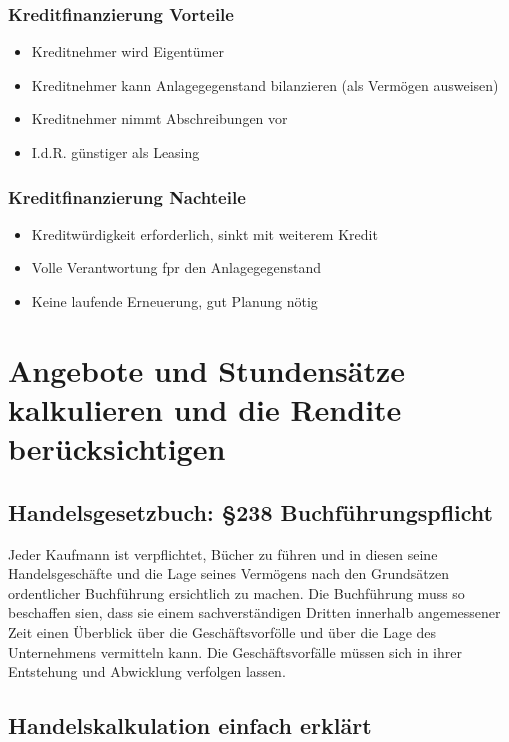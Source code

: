 \documentclass[a4paper, 12pt]{report}
\begin{document}
\begin{multicols}{2}
\subsubsection{Kreditfinanzierung Vorteile}
\begin{itemize}
    \item Kreditnehmer wird Eigentümer
    \item Kreditnehmer kann Anlagegegenstand bilanzieren (als Vermögen
	ausweisen)
    \item Kreditnehmer nimmt Abschreibungen vor
    \item I.d.R. günstiger als Leasing
\end{itemize}

\subsubsection{Kreditfinanzierung Nachteile}
\begin{itemize}
    \item Kreditwürdigkeit erforderlich, sinkt mit weiterem Kredit
    \item Volle Verantwortung fpr den Anlagegegenstand
    \item Keine laufende Erneuerung, gut Planung nötig
\end{itemize}

\section{Angebote und Stundensätze kalkulieren und die Rendite berücksichtigen}
\subsection{Handelsgesetzbuch: \S 238 Buchführungspflicht}

Jeder Kaufmann ist verpflichtet, Bücher zu führen und in diesen seine
Handelsgeschäfte und die Lage seines Vermögens nach den Grundsätzen ordentlicher
Buchführung ersichtlich zu machen. Die Buchführung muss so beschaffen sien, dass
sie einem sachverständigen Dritten innerhalb angemessener Zeit einen Überblick
über die Geschäftsvorfölle und über die Lage des Unternehmens vermitteln kann.
Die Geschäftsvorfälle müssen sich in ihrer Entstehung und Abwicklung verfolgen
lassen.

\subsection{Handelskalkulation einfach erklärt}


\end{multicols}
\end{document}

